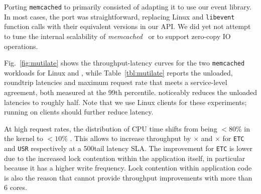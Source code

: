 Porting \texttt{memcached} to \ix primarily consisted of adapting it
to use our event library. In most cases, the port was straightforward,
replacing Linux and \texttt{libevent} function calls with their
equivalent versions in our API. We did yet not attempt to tune the
internal scalability of {\it memcached}~\cite{DBLP:conf/nsdi/FanAK13}
or to support zero-copy IO operations.


Fig.~\ref{fig:mutilate} shows the throughput-latency curves for the
two \texttt{memcached} workloads for Linux and \ix, while
Table~\ref{tbl:mutilate} reports the unloaded, roundtrip latencies and
maximum request rate that meets a service-level agreement, both
measured at the 99th percentile.  \ix noticeably reduces the unloaded
latencies to roughly half.  Note that we use Linux clients for these
experiments; running \ix on clients should further reduce latency.

At high request rates, the distribution of CPU time shifts from being
$<80\%$ in the  kernel  to $<10\%$ . This allows \ix
to increase throughput by $\times$ and $\times$ for
\texttt{ETC} and \texttt{USR} respectively at a 500\microsecond tail
latency SLA.  The improvement for \texttt{ETC} is lower due to the
increased lock contention within the application itself, in particular
because it has a higher write frequency.  Lock contention
within application code is also the reason that \ix cannot provide
throughput improvements with more than 6 cores.


%


